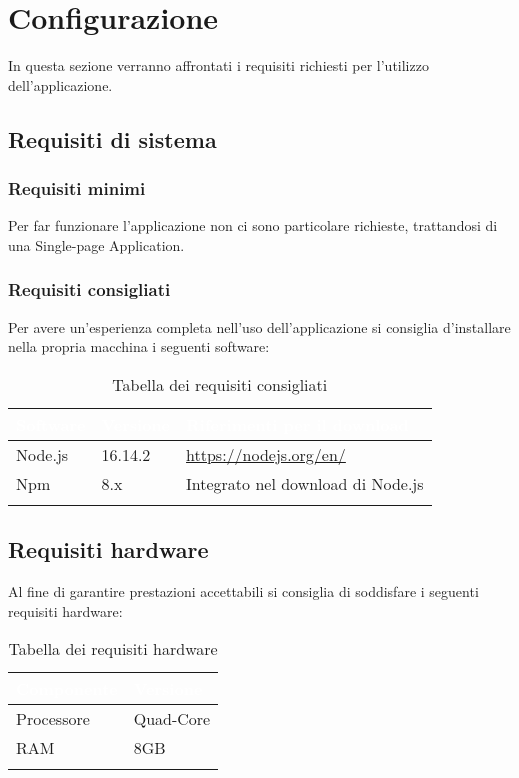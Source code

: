 \chapter{Configurazione}
In questa sezione verranno affrontati i requisiti richiesti per l'utilizzo dell'applicazione.

\section{Requisiti di sistema}
    \subsection{Requisiti minimi}
        Per far funzionare l'applicazione non ci sono particolare richieste, trattandosi di una Single-page Application.

    \subsection{Requisiti consigliati}
        Per avere un'esperienza completa nell'uso dell'applicazione si consiglia d'installare nella propria macchina i seguenti software: 
        \begin{longtable}{|p{2cm}|p{2cm}|p{6cm}|}
            \hline
            \rowcolor[HTML]{036400}
            \textcolor{white}{\textbf{Software}} & \textcolor{white}{\textbf{Versione}} & \textcolor{white}{\textbf{Riferimenti per il download}} \\ \hline
                \rowcolor[HTML]{EFEFEF}
                Node.js & 16.14.2 & \href{https://nodejs.org/en/}{https://nodejs.org/en/}  \\ \hline
                \rowcolor[HTML]{C0C0C0}
                Npm & 8.x & Integrato nel download di Node.js \\ \hline
                \caption{Tabella dei requisiti consigliati}
        \end{longtable}

\section{Requisiti hardware}
        Al fine di garantire prestazioni accettabili si consiglia di soddisfare i seguenti requisiti hardware:
        \begin{longtable}{|p{3cm}|p{3cm}|}
            \hline
            \rowcolor[HTML]{036400}
            \textcolor{white}{\textbf{Componente}} & \textcolor{white}{\textbf{Versione}} \\ \hline
                \rowcolor[HTML]{EFEFEF}
                Processore & Quad-Core \\ \hline
                \rowcolor[HTML]{C0C0C0}
                RAM & 8GB \\ \hline
                \caption{Tabella dei requisiti hardware}
        \end{longtable}


